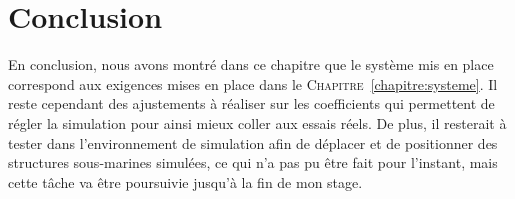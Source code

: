 	\section{Conclusion}

		En conclusion, nous avons montré dans ce chapitre que le système mis en place correspond aux exigences mises en place dans le \textsc{Chapitre}~\ref{chapitre:systeme}. Il reste cependant des ajustements à réaliser sur les coefficients qui permettent de régler la simulation pour ainsi mieux coller aux essais réels. De plus, il resterait à tester \atoll{} dans l'environnement de simulation afin de déplacer et de positionner des structures sous-marines simulées, ce qui n'a pas pu être fait pour l'instant, mais cette tâche va être poursuivie jusqu'à la fin de mon stage.